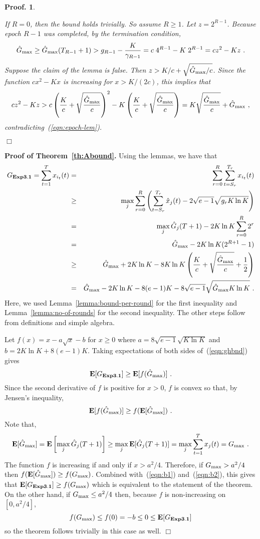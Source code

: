 \documentclass[12pt]{article}
\newcommand{\E}{\mbox{\rm\bf E}}
\newcommand{\Abound}{{\bf Exp3.1}}
\newcommand{\paren}[1]{\left({#1}\right)}
\newcommand{\brackets}[1]{\left[{#1}\right]}
\newcommand{\x}[2]{x_{#1}({#2})}
\renewcommand{\i}[1]{i_{#1}}
\newcommand{\xit}{\x{\i{t}}{t}}
\newcommand{\Gh}[1]{\hat{G}_{#1}}
\newcommand{\Ghbest}{\hat{G}_{\rm max}}
\newcommand{\Gbest}{G_{\rm max}}
\newcommand{\hx}[2]{\hat{x}_{#1}(#2)}
\newtheorem{pproof}{Proof.}
\newenvironment{proof}{
\begin{pproof}
        \begin{rm}\begin{rm}}{
        \hspace*{\fill} $\Box$
        \end{rm}\end{rm}
        \end{pproof}
}
\begin{document}
\begin{proof}
If $R=0$, then the bound holds trivially.
So assume $R \geq 1$. Let $z=2^{R-1}$.
Because epoch $R-1$ was completed, by the termination condition,
\begin{equation}
\label{eqn:epoch-lem}
\Ghbest \geq \Ghbest(T_{R-1}+1) > g_{R-1} - \frac{K}{\gamma_{R-1}} 
 = c\; 4^{R-1} - K\; 2^{R-1} = c z^2 - K z~.
\end{equation}
Suppose the claim of the lemma is false.
Then $z > K/c + \sqrt{\Ghbest/c}$.
Since the function $c x^2 - K x$ is increasing for $x>K/(2c)$,
this implies that
\[
c z^2 - K z
 > c \paren{\frac{K}{c} + \sqrt{\frac{\Ghbest}{c}}}^2
  - K \paren{\frac{K}{c} + \sqrt{\frac{\Ghbest}{c}}}
 = K \sqrt{\frac{\Ghbest}{c}} + \Ghbest~,
\]
contradicting~(\ref{eqn:epoch-lem}).
\end{proof}
%
{\bf Proof of Theorem~\ref{th:Abound}.}
Using the lemmas, we have that
\begin{eqnarray}
G_{\Abound} =
    \sum_{t=1}^T \xit
&=&
    \sum_{r=0}^R \sum_{t=S_r}^{T_r} \xit
\nonumber \\ & \geq &
    \max_j \sum_{r=0}^R \paren{\sum_{t=S_r}^{T_r} \hx{j}{t}
                               - 2\sqrt{e-1}\sqrt{g_r K\ln K}}
\nonumber \\ &=&
    \max_j \Gh{j}(T+1) - 2 K\ln K \sum_{r=0}^R 2^r
\nonumber \\ &=&
    \Ghbest - 2 K\ln K (2^{R+1} - 1)
\nonumber \\ &\geq&
    \Ghbest + 2 K\ln K
        - 8 K\ln K \paren{
              \frac{K}{c} + \sqrt{\frac{\Ghbest}{c}} + \frac{1}{2} }
\nonumber \\ &=&
    \Ghbest - 2 K\ln K - 8(e-1)K - 8\sqrt{e-1}\sqrt{ \Ghbest K \ln K}~.
\label{eqn:ghbnd}
\end{eqnarray}
Here, we used Lemma~\ref{lemma:bound-per-round} for the first inequality and
Lemma~\ref{lemma:no-of-rounds} for the second inequality.
The other steps follow from definitions and simple algebra.

Let $f(x) = x - a\sqrt{x} - b$ for $x\geq 0$ where
$a=8\sqrt{e-1}\sqrt{K \ln K}$ and
$b=2 K\ln K + 8(e-1)K$.
Taking expectations of both sides of~(\ref{eqn:ghbnd}) gives
\begin{equation} \label{eqn:b1}
\E[G_{\Abound}] \geq \E[f(\Ghbest)]~.
\end{equation}
Since the second derivative of $f$ is positive for $x>0$, $f$ is
convex so that, by Jensen's inequality,
\begin{equation} \label{eqn:b2}
\E[f(\Ghbest)] \geq f(\E[\Ghbest])~.
\end{equation}
Note that,
\[
\E[\Ghbest] = \E\brackets{\max_j \Gh{j}(T+1)}
\geq \max_j \E[\Gh{j}(T+1)]
= \max_j \sum_{t=1}^T \x{j}{t} = \Gbest~.
\]
The function $f$ is increasing if and only if $x>a^2/4$.
Therefore, if $\Gbest > a^2/4$ then
$f(\E[\Ghbest]) \geq f(\Gbest)$.
Combined with~(\ref{eqn:b1}) and~(\ref{eqn:b2}), this gives that
$\E[G_{\Abound}] \geq f(\Gbest)$ which is equivalent to the statement
of the theorem.
On the other hand, if $\Gbest \leq a^2/4$ then, because $f$ is
non-increasing on $[0,a^2/4]$,
\[ f(\Gbest)\leq f(0) = -b \leq 0 \leq \E[G_\Abound] \]
so the theorem follows trivially in this case as well.
\hfill $\Box$
\end{document}
